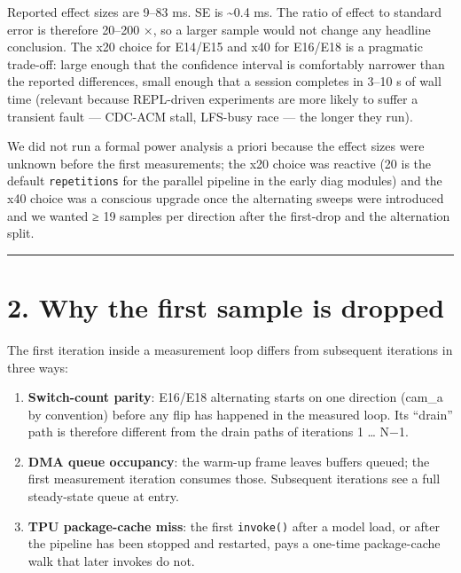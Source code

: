 Reported effect sizes are 9--83 ms. SE is \textasciitilde0.4 ms. The
ratio of effect to standard error is therefore 20--200 ×, so a larger
sample would not change any headline conclusion. The x20 choice for
E14/E15 and x40 for E16/E18 is a pragmatic trade-off: large enough that
the confidence interval is comfortably narrower than the reported
differences, small enough that a session completes in 3--10 s of wall
time (relevant because REPL-driven experiments are more likely to suffer
a transient fault --- CDC-ACM stall, LFS-busy race --- the longer they
run).

We did not run a formal power analysis a priori because the effect sizes
were unknown before the first measurements; the x20 choice was reactive
(20 is the default \texttt{repetitions} for the parallel pipeline in the
early diag modules) and the x40 choice was a conscious upgrade once the
alternating sweeps were introduced and we wanted ≥ 19 samples per
direction after the first-drop and the alternation split.

\begin{center}\rule{0.5\linewidth}{0.5pt}\end{center}

\section{2. Why the first sample is
dropped}\label{why-the-first-sample-is-dropped}

The first iteration inside a measurement loop differs from subsequent
iterations in three ways:

\begin{enumerate}
\def\labelenumi{\arabic{enumi}.}
\tightlist
\item
  \textbf{Switch-count parity}: E16/E18 alternating starts on one
  direction (cam\_a by convention) before any flip has happened in the
  measured loop. Its ``drain'' path is therefore different from the
  drain paths of iterations 1 \ldots{} N−1.
\item
  \textbf{DMA queue occupancy}: the warm-up frame leaves buffers queued;
  the first measurement iteration consumes those. Subsequent iterations
  see a full steady-state queue at entry.
\item
  \textbf{TPU package-cache miss}: the first \texttt{invoke()} after a
  model load, or after the pipeline has been stopped and restarted, pays
  a one-time package-cache walk that later invokes do not.
\end{enumerate}


